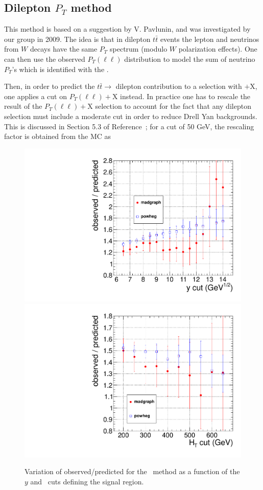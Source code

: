 \subsection{Dilepton $P_T$ method}
\label{sec:victory}
This method is based on a suggestion by V. Pavlunin\cite{ref:victory},
and was investigated by our group in 2009\cite{ref:ourvictory}.
The idea is that in dilepton $t\bar{t}$ events the lepton and neutrinos
from $W$ decays have the same $P_T$ spectrum (modulo $W$ polarization 
effects).  One can then use the observed 
$P_T(\ell\ell)$ distribution to model the sum of neutrino $P_T$'s which 
is identified with the \met.

Then, in order to predict the $t\bar{t} \to$ dilepton contribution to a 
selection with \met$+$X, one applies a cut on $P_T(\ell\ell)+$X instead.
In practice one has to rescale the result of the $P_T(\ell\ell)+$X selection
to account for the fact that any dilepton selection must include a 
moderate \met cut in order to reduce Drell Yan backgrounds.  This 
is discussed in Section 5.3 of Reference~\cite{ref:ourvictory}; for a \met
cut of 50 GeV, the rescaling factor is obtained from the MC as


\begin{figure}[hbt]
\begin{center}
\includegraphics[width=0.48\linewidth]{plots/victory_yvary.pdf}
\includegraphics[width=0.48\linewidth]{plots/victory_htvary.pdf}
\caption{\label{fig:victory}\protect Variation of observed/predicted
for the \ptll\ method as a function of the $y$ and \Ht\ cuts defining
the signal region.}
\end{center}
\end{figure}


